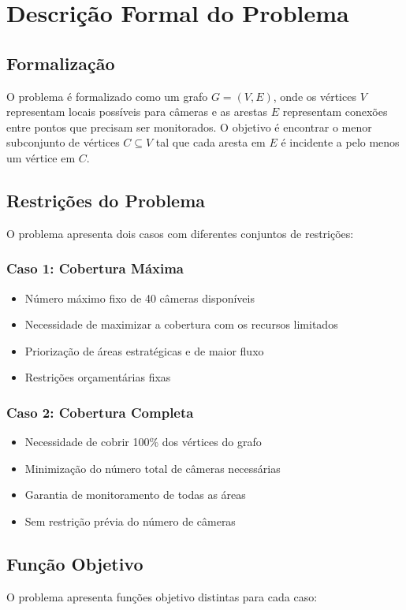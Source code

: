 \documentclass[12pt, a4paper]{report}
\begin{document}
\chapter{Descrição Formal do Problema}

\section{Formalização}
O problema é formalizado como um grafo \(G = (V, E)\), onde os vértices \(V\) representam locais possíveis para câmeras e as arestas \(E\) representam conexões entre pontos que precisam ser monitorados. O objetivo é encontrar o menor subconjunto de vértices \(C \subseteq V\) tal que cada aresta em \(E\) é incidente a pelo menos um vértice em \(C\).

\section{Restrições do Problema}
O problema apresenta dois casos com diferentes conjuntos de restrições:

\subsection{Caso 1: Cobertura Máxima}
\begin{itemize}
    \item Número máximo fixo de 40 câmeras disponíveis
    \item Necessidade de maximizar a cobertura com os recursos limitados
    \item Priorização de áreas estratégicas e de maior fluxo
    \item Restrições orçamentárias fixas
\end{itemize}

\subsection{Caso 2: Cobertura Completa}
\begin{itemize}
    \item Necessidade de cobrir 100\% dos vértices do grafo
    \item Minimização do número total de câmeras necessárias
    \item Garantia de monitoramento de todas as áreas
    \item Sem restrição prévia do número de câmeras
\end{itemize}

\section{Função Objetivo}
O problema apresenta funções objetivo distintas para cada caso:
\end{document}
